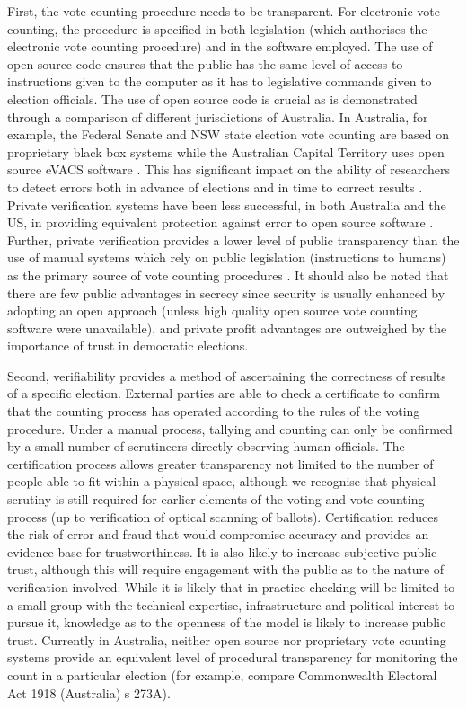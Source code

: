 First, the vote counting procedure needs to be transparent. For
electronic vote counting, the procedure is specified in both
legislation (which authorises the electronic vote counting
procedure) and in the software employed. The use of open source code
ensures that the public has the same level of access to instructions
given to the computer as it has to legislative commands given to
election officials. The use of open source code is crucial as is
demonstrated through a comparison of different jurisdictions of
Australia. In Australia, for example, the Federal Senate and NSW
state election vote counting are based on proprietary black box
systems while the Australian Capital Territory uses open source
eVACS software
\citep{AEC:2013:LMM,Conway:2017:ANS,EA:2016:EVC}. This has
significant impact on the ability of researchers to detect errors
both in advance of elections and in time to correct results
\citep{Conway:2017:ANS}.
Private verification systems have been less successful, in both
Australia and the US, in providing equivalent protection against
error to open source software
\citep{Carrier:2012:VCT,Conway:2017:ANS}. Further, private
verification provides a lower level of public transparency than the
use of manual systems which rely on public legislation (instructions
to humans) as the primary source of vote counting procedures
\citep{Carrier:2012:VCT}. It
should also be noted that there are few public advantages in secrecy
since security is usually enhanced by adopting an open approach
(unless high quality open source vote counting software were
unavailable), and private profit advantages are outweighed by the
importance of trust in democratic elections. 

Second, verifiability provides a method of ascertaining the
correctness of
results of a specific election. External parties are able to check a
certificate to confirm that the counting process has operated
according to the rules of the voting procedure.
Under a manual process, tallying and counting can only be confirmed by a small number of scrutineers directly observing human
officials. The certification process allows greater transparency not
limited to the number of people able to fit within a physical space,
although we recognise that physical scrutiny is still required for
earlier elements of the voting and vote counting process (up to
verification of optical scanning of ballots). Certification reduces
the risk of error and fraud that would compromise accuracy and
provides an evidence-base for trustworthiness. It is also likely to
increase subjective public trust, although this will require
engagement with the public as to the nature of verification
involved. While it is likely that in practice checking will be
limited to a small group with the technical expertise,
infrastructure and political interest to pursue it, knowledge as to
the openness of the model is likely to increase public trust.
Currently in Australia, neither open source nor proprietary vote
counting systems provide an equivalent level of procedural
transparency for monitoring the count in a particular election (for
example, compare Commonwealth Electoral Act 1918 (Australia) s
273A). 

